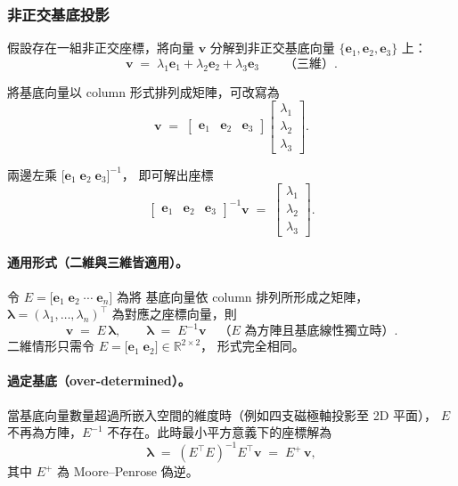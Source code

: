 \documentclass{article}
\begin{document}
\subsubsection*{非正交基底投影}

假設存在一組非正交座標，將向量 $\mathbf{v}$ 分解到非正交基底向量
$\{\mathbf{e}_1, \mathbf{e}_2, \mathbf{e}_3\}$ 上：
\begin{equation}
\mathbf{v} \;=\; \lambda_1 \mathbf{e}_1 + \lambda_2 \mathbf{e}_2 + \lambda_3 \mathbf{e}_3
\qquad \text{（三維）} .
\end{equation}

將基底向量以 column 形式排列成矩陣，可改寫為
\begin{equation}
\mathbf{v}
\;=\;
\begin{bmatrix} \mathbf{e}_1 & \mathbf{e}_2 & \mathbf{e}_3 \end{bmatrix}
\begin{bmatrix} \lambda_1 \\ \lambda_2 \\ \lambda_3 \end{bmatrix} .
\end{equation}

兩邊左乘 $\bigl[\mathbf{e}_1\; \mathbf{e}_2\; \mathbf{e}_3\bigr]^{-1}$，
即可解出座標
\begin{equation}
\begin{bmatrix} \mathbf{e}_1 & \mathbf{e}_2 & \mathbf{e}_3 \end{bmatrix}^{-1}
\mathbf{v}
\;=\;
\begin{bmatrix} \lambda_1 \\ \lambda_2 \\ \lambda_3 \end{bmatrix} .
\end{equation}

\paragraph{通用形式（二維與三維皆適用）。}
令 $E = \bigl[\mathbf{e}_1\; \mathbf{e}_2\; \cdots\; \mathbf{e}_n\bigr]$ 為將
基底向量依 column 排列所形成之矩陣，
$\bm{\lambda} = (\lambda_1,\ldots,\lambda_n)^{\!\top}$ 為對應之座標向量，則
\begin{equation}
\mathbf{v} \;=\; E\,\bm{\lambda},
\qquad
\bm{\lambda} \;=\; E^{-1} \mathbf{v}
\quad\text{（$E$ 為方陣且基底線性獨立時）} .
\end{equation}
二維情形只需令 $E = \bigl[\mathbf{e}_1\; \mathbf{e}_2\bigr] \in \mathbb{R}^{2\times 2}$，
形式完全相同。

\paragraph{過定基底（over-determined）。}
當基底向量數量超過所嵌入空間的維度時（例如四支磁極軸投影至 2D 平面），
$E$ 不再為方陣，$E^{-1}$ 不存在。此時最小平方意義下的座標解為
\begin{equation}
\bm{\lambda} \;=\; (E^{\!\top} E)^{-1} E^{\!\top} \mathbf{v}
\;=\; E^{+}\,\mathbf{v} ,
\end{equation}
其中 $E^{+}$ 為 Moore--Penrose 偽逆。
\end{document}
